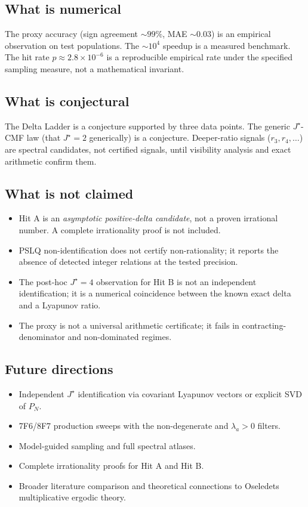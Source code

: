 \documentclass[11pt]{article}
\begin{document}
\subsection{What is numerical}
The proxy accuracy (sign agreement $\sim 99\%$, MAE $\sim 0.03$) is an empirical observation on test populations. The $\sim 10^4$ speedup is a measured benchmark. The hit rate $p \approx 2.8 \times 10^{-6}$ is a reproducible empirical rate under the specified sampling measure, not a mathematical invariant.

\subsection{What is conjectural}
The Delta Ladder is a conjecture supported by three data points. The generic $J^\star$-CMF law (that $J^\star = 2$ generically) is a conjecture. Deeper-ratio signals ($r_3, r_4, \ldots$) are spectral candidates, not certified signals, until visibility analysis and exact arithmetic confirm them.

\subsection{What is not claimed}
\begin{itemize}
\item Hit A is an \emph{asymptotic positive-delta candidate}, not a proven irrational number. A complete irrationality proof is not included.
\item PSLQ non-identification does not certify non-rationality; it reports the absence of detected integer relations at the tested precision.
\item The post-hoc $J^\star = 4$ observation for Hit B is not an independent identification; it is a numerical coincidence between the known exact delta and a Lyapunov ratio.
\item The proxy is not a universal arithmetic certificate; it fails in contracting-denominator and non-dominated regimes.
\end{itemize}

\subsection{Future directions}
\begin{itemize}
\item Independent $J^\star$ identification via covariant Lyapunov vectors or explicit SVD of $P_N$.
\item 7F6/8F7 production sweeps with the non-degenerate and $\lambda_a > 0$ filters.
\item Model-guided sampling and full spectral atlases.
\item Complete irrationality proofs for Hit A and Hit B.
\item Broader literature comparison and theoretical connections to Oseledets multiplicative ergodic theory.
\end{itemize}
\end{document}
